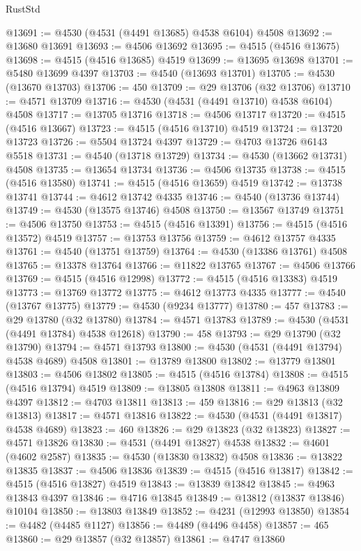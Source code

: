 \begin{lexlean}{RustStd}
\begin{coremodule}
{\begin{coremodule}
{{{{{{{{{{{{{{{{{{{{{{{{{{{{{{{{{{{{{{{{{{{{{{{{{{{{{{{@13691 := @4530 (@4531 (@4491 @13685) @4538 @6104) @4508
@13692 := @13680 @13691
@13693 := @4506 @13692
@13695 := @4515 (@4516 @13675)
@13698 := @4515 (@4516 @13685) @4519
@13699 := @13695 @13698
@13701 := @5480 @13699 @4397
@13703 := @4540 (@13693 @13701)
@13705 := @4530 (@13670 @13703)
@13706 := 450
@13709 := @29 @13706 (@32 @13706)
@13710 := @4571 @13709
@13716 := @4530 (@4531 (@4491 @13710) @4538 @6104) @4508
@13717 := @13705 @13716
@13718 := @4506 @13717
@13720 := @4515 (@4516 @13667)
@13723 := @4515 (@4516 @13710) @4519
@13724 := @13720 @13723
@13726 := @5504 @13724 @4397
@13729 := @4703 @13726 @6143 @5518
@13731 := @4540 (@13718 @13729)
@13734 := @4530 (@13662 @13731) @4508
@13735 := @13654 @13734
@13736 := @4506 @13735
@13738 := @4515 (@4516 @13580)
@13741 := @4515 (@4516 @13659) @4519
@13742 := @13738 @13741
@13744 := @4612 @13742 @4335
@13746 := @4540 (@13736 @13744)
@13749 := @4530 (@13575 @13746) @4508
@13750 := @13567 @13749
@13751 := @4506 @13750
@13753 := @4515 (@4516 @13391)
@13756 := @4515 (@4516 @13572) @4519
@13757 := @13753 @13756
@13759 := @4612 @13757 @4335
@13761 := @4540 (@13751 @13759)
@13764 := @4530 (@13386 @13761) @4508
@13765 := @13378 @13764
@13766 := @11822 @13765
@13767 := @4506 @13766
@13769 := @4515 (@4516 @12998)
@13772 := @4515 (@4516 @13383) @4519
@13773 := @13769 @13772
@13775 := @4612 @13773 @4335
@13777 := @4540 (@13767 @13775)
@13779 := @4530 (@9234 @13777)
@13780 := 457
@13783 := @29 @13780 (@32 @13780)
@13784 := @4571 @13783
@13789 := @4530 (@4531 (@4491 @13784) @4538 @12618)
@13790 := 458
@13793 := @29 @13790 (@32 @13790)
@13794 := @4571 @13793
@13800 := @4530 (@4531 (@4491 @13794) @4538 @4689) @4508
@13801 := @13789 @13800
@13802 := @13779 @13801
@13803 := @4506 @13802
@13805 := @4515 (@4516 @13784)
@13808 := @4515 (@4516 @13794) @4519
@13809 := @13805 @13808
@13811 := @4963 @13809 @4397
@13812 := @4703 @13811
@13813 := 459
@13816 := @29 @13813 (@32 @13813)
@13817 := @4571 @13816
@13822 := @4530 (@4531 (@4491 @13817) @4538 @4689)
@13823 := 460
@13826 := @29 @13823 (@32 @13823)
@13827 := @4571 @13826
@13830 := @4531 (@4491 @13827) @4538
@13832 := @4601 (@4602 @2587)
@13835 := @4530 (@13830 @13832) @4508
@13836 := @13822 @13835
@13837 := @4506 @13836
@13839 := @4515 (@4516 @13817)
@13842 := @4515 (@4516 @13827) @4519
@13843 := @13839 @13842
@13845 := @4963 @13843 @4397
@13846 := @4716 @13845
@13849 := @13812 (@13837 @13846) @10104
@13850 := @13803 @13849
@13852 := @4231 (@12993 @13850)
@13854 := @4482 (@4485 @1127)
@13856 := @4489 (@4496 @4458)
@13857 := 465
@13860 := @29 @13857 (@32 @13857)
@13861 := @4747 @13860
}}}}}}}}}}}}}}}}}}}}}}}}}}}}}}}}}}}}}}}}}}}}}}}}}}}}}}}
\end{coremodule}}
\end{coremodule}
\end{lexlean}
